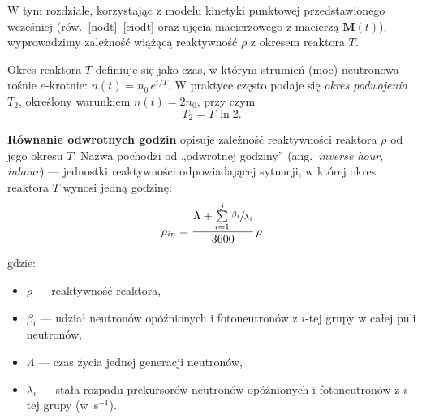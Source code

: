 W tym rozdziale, korzystając z modelu kinetyki punktowej przedstawionego wcześniej (rów.~\eqref{nodt}–\eqref{ciodt} oraz ujęcia macierzowego z macierzą $\mathbf{M}(t)$), wyprowadzimy zależność wiążącą reaktywność $\rho$ z okresem reaktora $T$.

Okres reaktora $T$ definiuje się jako czas, w którym strumień (moc) neutronowa rośnie $e$-krotnie: $n(t)=n_0\,e^{t/T}$. 
W praktyce często podaje się \emph{okres podwojenia} $T_2$, określony warunkiem $n(t)=2n_0$, przy czym
\[
T_2 = T\,\ln 2.
\]

\noindent\textbf{Równanie odwrotnych godzin} opisuje zależność reaktywności reaktora $\rho$ od jego okresu $T$. 
Nazwa pochodzi od „odwrotnej godziny” (ang.\ \emph{inverse hour}, \emph{inhour}) — jednostki reaktywności odpowiadającej sytuacji, w której okres reaktora $T$ wynosi jedną godzinę:
\begin{equation}
	\rho_{in}=\frac{\Lambda + \sum\limits_{i=1}^j \sfrac{\beta_i}{\lambda_i}}{3600}\,\rho
	\label{IN}
\end{equation}

\noindent gdzie:
\begin{itemize}
	\item $\rho$ — reaktywność reaktora,
	\item $\beta_i$ — udział neutronów opóźnionych i fotoneutronów z $i$-tej grupy w całej puli neutronów,
	\item $\Lambda$ — czas życia jednej generacji neutronów,
	\item $\lambda_i$ — stała rozpadu prekursorów neutronów opóźnionych i fotoneutronów z $i$-tej grupy (w~s$^{-1}$).
\end{itemize}

